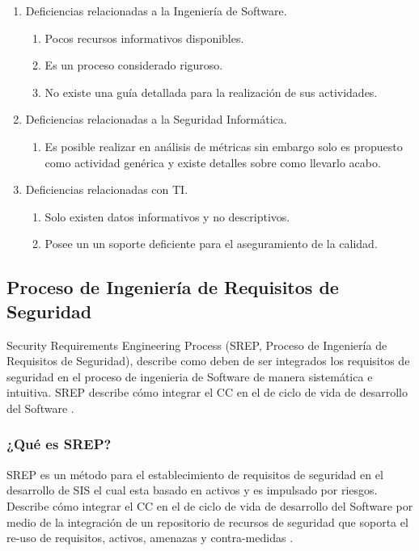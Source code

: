 \documentclass[runningheads,a4paper]{llncs}
\begin{document}
\begin{enumerate}
	\item Deficiencias relacionadas a la Ingeniería de \gls{Software}.
		\begin{enumerate}
			\item Pocos recursos informativos disponibles. 
			\item Es un proceso considerado riguroso.
			\item No existe una guía detallada para la realización de sus actividades.\\
			
		\end{enumerate}
	\item Deficiencias relacionadas a la Seguridad Informática.
		\begin{enumerate}
			\item Es posible realizar en análisis de métricas sin embargo solo es propuesto como actividad genérica y existe detalles sobre como llevarlo acabo.\\
			
		\end{enumerate}
	\item Deficiencias relacionadas con \gls{TI}.
		\begin{enumerate}
			\item Solo existen datos informativos y no descriptivos.
			\item Posee un un soporte deficiente para el aseguramiento de la calidad.
			
		\end{enumerate}
\end{enumerate}

\subsection{Proceso de Ingeniería de Requisitos de Seguridad}
Security Requirements Engineering Process (SREP, Proceso de Ingeniería de Requisitos de Seguridad), describe como deben de ser integrados los requisitos de seguridad en el proceso de ingenieria de \gls{Software} de manera sistemática e intuitiva. \gls{SREP} describe cómo integrar el \gls{CC} en el de ciclo de vida de desarrollo del \gls{Software} \cite{SREPMellado}.  

\subsubsection{¿Qué es \gls{SREP}?}
\gls{SREP} es un método para el establecimiento de requisitos de seguridad en el desarrollo de \gls{SIS} el cual esta basado en activos y es impulsado por riesgos. Describe cómo integrar el \gls{CC} en el de ciclo de vida de desarrollo del \gls{Software} por medio de la integración de un repositorio de recursos de seguridad que soporta el re-uso de requisitos, activos, amenazas y contra-medidas  \cite{SREPMellado}.\\
\end{document}
